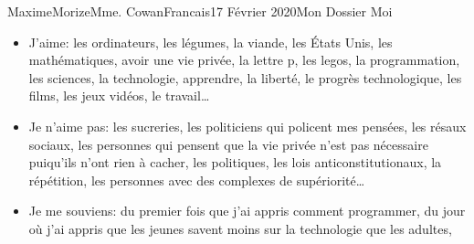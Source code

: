 \documentclass[12pt, letterpaper]{article}
\begin{document}
\begin{mla}{Maxime}{Morize}{Mme. Cowan}{Francais}{17 F\'evrier 2020}{Mon Dossier
    Moi}
  \begin{itemize}
    \item J'aime: les ordinateurs, les l\'egumes, la viande, les \'Etats Unis,
      les math\'ematiques, avoir une vie priv\'ee, la lettre p, les legos, la
      programmation, les sciences, la technologie, apprendre, la libert\'e, le
      progr\`es technologique, les films, les jeux vid\'eos, le travail\ldots
    \item Je n'aime pas: les sucreries, les politiciens qui policent mes pens\'ees, les
      r\'esaux sociaux, les personnes qui pensent que la vie priv\'ee n'est pas
      n\'ecessaire puiqu'ils n'ont rien \`a cacher, les politiques, les lois
      anticonstitutionaux, la r\'ep\'etition, les personnes avec des complexes
      de sup\'eriorit\'e\ldots
     \item Je me souviens: du premier fois que j'ai appris comment programmer,
      du jour o\`u j'ai appris que les jeunes savent moins sur la technologie
      que les adultes,

  \end{itemize}
\end{mla}
\end{document}
